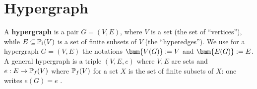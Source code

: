 \documentclass[]{book}
\begin{document}
\section{Hypergraph}
\label{sec:hpg}

\begin{defi}\label{def:hypergraphs}
  A \textbf{hypergraph} is a pair $G=(V,E)$, where $V$ is a set (the set of ``vertices''), while $E \subseteq \operatorname{\mathbb{P}_f}(V)$ is a set of finite subsets of $V$ (the ``hyperedges''). 
  We use for a hypergraph $G = (V,E)$ the notations $\bmm{V(G)} := V$ and $\bmm{E(G)} := E$. A general hypergraph is a triple $(V,E,e)$ where $V, E$ are sets and $e:E \rightarrow \operatorname{\mathbb{P}}_f(V)$ 
  where $\operatorname{\mathbb{P}}_f(V)$ for a set $X$ is the set of finite subsets of $X$: one writes $e(G)=e$ \cite{h5}. 
\end{defi}
\end{document}

